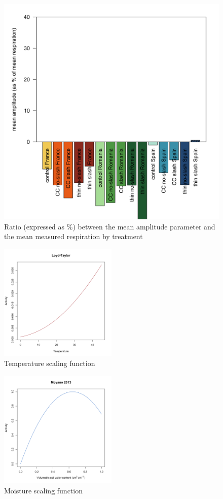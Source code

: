 \documentclass[
]{article}
\begin{document}
\begin{figure}
\centering
\includegraphics{../Figures/Amplitude_ratio.png}
\caption{Ratio (expressed as \%) between the mean amplitude parameter and the mean measured respiration by treatment}
\end{figure}

\begin{figure}
\centering
\includegraphics[width=0.5\textwidth,height=\textheight]{../Figures/Temp.png}
\caption{Temperature scaling function}
\end{figure}

\begin{figure}
\centering
\includegraphics[width=0.5\textwidth,height=\textheight]{../Figures/Moist.png}
\caption{Moisture scaling function}
\end{figure}
\end{document}
